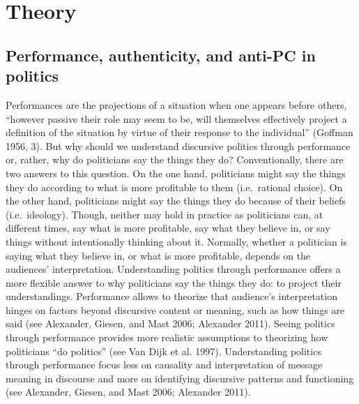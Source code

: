 \documentclass[smallextended]{svjour3}       %
\begin{document}
\hypertarget{theory}{%
\section{Theory}\label{theory}}

\hypertarget{performance-authenticity-and-anti-pc-in-politics}{%
\subsection{Performance, authenticity, and anti-PC in
politics}\label{performance-authenticity-and-anti-pc-in-politics}}

Performances are the projections of a situation when one appears before
others, ``however passive their role may seem to be, will themselves
effectively project a definition of the situation by virtue of their
response to the individual'' (Goffman 1956, 3). But why should we
understand discursive politics through performance or, rather, why do
politicians say the things they do? Conventionally, there are two
answers to this question. On the one hand, politicians might say the
things they do according to what is more profitable to them
(i.e.~rational choice). On the other hand, politicians might say the
things they do because of their beliefs (i.e.~ideology). Though, neither
may hold in practice as politicians can, at different times, say what is
more profitable, say what they believe in, or say things without
intentionally thinking about it. Normally, whether a politician is
saying what they believe in, or what is more profitable, depends on the
audiences' interpretation. Understanding politics through performance
offers a more flexible answer to why politicians say the things they do:
to project their understandings. Performance allows to theorize that
audience's interpretation hinges on factors beyond discursive content or
meaning, such as how things are said (see Alexander, Giesen, and Mast
2006; Alexander 2011). Seeing politics through performance provides more
realistic assumptions to theorizing how politicians ``do politics'' (see
Van Dijk et al. 1997). Understanding politics through performance focus
less on causality and interpretation of message meaning in discourse and
more on identifying discursive patterns and functioning (see Alexander,
Giesen, and Mast 2006; Alexander 2011).
\end{document}
